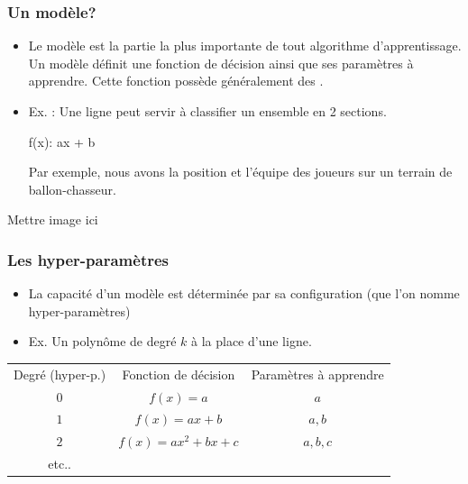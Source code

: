 \documentclass[french]{beamer}
\begin{document}
\begin{frame}
\frametitle{Un modèle?}
\begin{itemize}
\item Le modèle est la partie la plus importante de tout algorithme d'apprentissage. Un modèle définit une fonction de décision ainsi que ses paramètres à apprendre. Cette fonction possède généralement des .

\item Ex. : Une ligne peut servir à classifier un ensemble en 2 sections. 

	f(x): ax + b

Par exemple, nous avons la position et l'équipe des joueurs sur un terrain de ballon-chasseur. 

\end{itemize}

\begin{center}
Mettre image ici
\end{center}

\end{frame}

\begin{frame}
\frametitle{Les hyper-paramètres}

\begin{itemize}
\item La capacité d'un modèle est déterminée par sa configuration (que l'on nomme hyper-paramètres)

\item Ex. Un polynôme de degré $k$ à la place d'une ligne.
\end{itemize}

\begin{tabular}{ccc}
Degré (hyper-p.) & Fonction de décision & Paramètres à apprendre \\
$0$	& $f(x) = a$ & $a$ \\
$1$ & $f(x) = ax+b$ & $a,b$ \\
$2$ & $f(x) = ax^2 + bx + c$ & $a,b,c$ \\
etc..& &
\end{tabular}

\end{frame}
\end{document}
